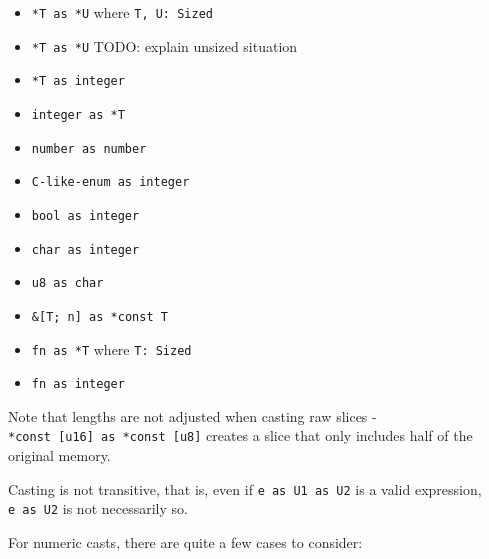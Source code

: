 \documentclass[a4paper,]{book}
\providecommand{\tightlist}{%
  \setlength{\itemsep}{0pt}\setlength{\parskip}{0pt}}
\begin{document}
\begin{itemize}
\tightlist
\item
  \texttt{*T\ as\ *U} where \texttt{T,\ U:\ Sized}
\item
  \texttt{*T\ as\ *U} TODO: explain unsized situation
\item
  \texttt{*T\ as\ integer}
\item
  \texttt{integer\ as\ *T}
\item
  \texttt{number\ as\ number}
\item
  \texttt{C-like-enum\ as\ integer}
\item
  \texttt{bool\ as\ integer}
\item
  \texttt{char\ as\ integer}
\item
  \texttt{u8\ as\ char}
\item
  \texttt{\&{[}T;\ n{]}\ as\ *const\ T}
\item
  \texttt{fn\ as\ *T} where \texttt{T:\ Sized}
\item
  \texttt{fn\ as\ integer}
\end{itemize}

Note that lengths are not adjusted when casting raw slices -
\texttt{*const\ {[}u16{]}\ as\ *const\ {[}u8{]}} creates a slice that
only includes half of the original memory.

Casting is not transitive, that is, even if \texttt{e\ as\ U1\ as\ U2}
is a valid expression, \texttt{e\ as\ U2} is not necessarily so.

For numeric casts, there are quite a few cases to consider:
\end{document}
